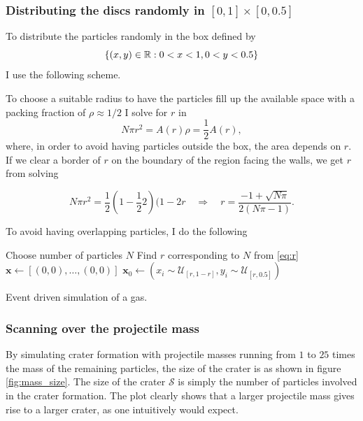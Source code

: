 \subsubsection{Distributing the discs randomly in $[0,1]\times[0,0.5]$}

To distribute the particles randomly in the box defined by 
$$
\{(x,y)\in \mathbb{R} : 0 < x < 1, 0 < y < 0.5\}
$$ 
I use the following scheme. 

To choose a suitable radius to have the particles fill up the available space with a packing fraction of $\rho \approx 1/2$ I solve for $r$ in 
$$
	N \pi r^2 = A(r) \rho = \frac{1}{2} A(r),  
$$
where, in order to avoid having particles outside the box, the area depends on $r$. If we clear a border of $r$ on the boundary of the region facing the walls, we get $r$ from solving

\begin{equation}\label{eq:r}
	N \pi r^2 = \frac{1}{2} (1- \frac{1}{2}2) (1-2r \quad \Rightarrow \quad r = \frac{-1 + \sqrt{N\pi}}{2(N\pi - 1)}.
\end{equation}

To avoid having overlapping particles, I do the following

\begin{algorithm}[H]
	Choose number of particles $N$\;
	Find $r$ corresponding to $N$ from \eqref{eq:r}\;
	$\mathbf{x} \gets [(0,0),\dots,(0,0)]$\;
	$\mathbf{x}_0 \gets (x_i \sim \mathcal{U}_{[r,1-r]},y_i \sim \mathcal{U}_{[r,0.5]})$\;
	\caption{Event driven simulation of a gas.}
\end{algorithm}  


\subsubsection{Scanning over the projectile mass}

By simulating crater formation with projectile masses running from $1$ to $25$ times the mass of the remaining particles, the size of the crater is as shown in figure \ref{fig:mass_size}. The size of the crater $\mathcal{S}$ is simply the number of particles involved in the crater formation. The plot clearly shows that a larger projectile mass gives rise to a larger crater, as one intuitively would expect. 

